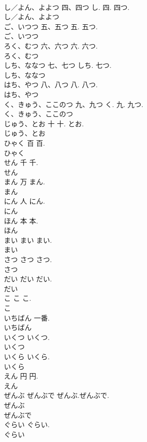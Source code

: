 \documentclass[8pt]{extreport}
\begin{document}
\begin{CJK}{UTF8}{min}
\\	し／よん、よよつ	四、四つ	し. 四. 四つ.	
\\	し／よん、よよつ
\\	ご、いつつ	五、五つ	五. 五つ.	
\\	ご、いつつ
\\	ろく、むつ	六、六つ	六. 六つ.	
\\	ろく、むつ
\\	しち、ななつ	七、七つ	しち. 七つ.	
\\	しち、ななつ
\\	はち、やつ	八、八つ	八. 八つ.	
\\	はち、やつ
\\	く、きゅう、ここのつ	九、九つ	く. 九. 九つ.	
\\	く、きゅう、ここのつ
\\	じゅう、とお	十	十. とお.	
\\	じゅう、とお
\\	ひゃく	百	百.	
\\	ひゃく
\\	せん	千	千.	
\\	せん
\\	まん	万	まん.	
\\	まん
\\	にん	人	にん.	
\\	にん
\\	ほん	本	本.	
\\	ほん
\\	まい	まい	まい.	
\\	まい
\\	さつ	さつ	さつ.	
\\	さつ
\\	だい	だい	だい.	
\\	だい
\\	こ	こ	こ.	
\\	こ
\\	いちばん		一番.	
\\	いちばん
\\	いくつ		いくつ.	
\\	いくつ
\\	いくら		いくら.	
\\	いくら
\\	えん	円	円.	
\\	えん
\\	ぜんぶ ぜんぶで		ぜんぶ.ぜんぶで.	
\\	ぜんぶ
\\	ぜんぶで
\\	ぐらい		ぐらい.	
\\	ぐらい

\end{CJK}
\end{document}
